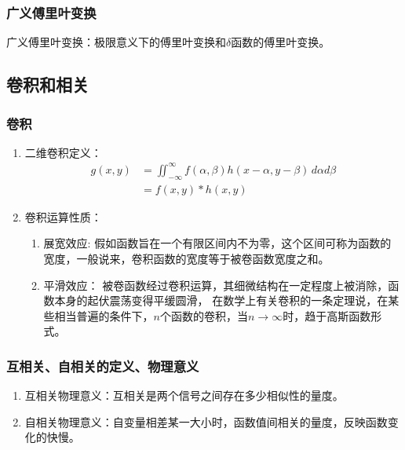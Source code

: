 \documentclass[twocolumn]{ctexart}
\begin{document}
\subsubsection{广义傅里叶变换}
广义傅里叶变换：极限意义下的傅里叶变换和$\delta $函数的傅里叶变换。

\subsection{卷积和相关}
\subsubsection{卷积}
\begin{enumerate}
    \item 二维卷积定义：
          \begin{equation}
              \begin{aligned}
                  g\left(x,y\right) & =\iint ^{\infty} _{-\infty} f\left(\alpha ,\beta\right)h\left(x-\alpha ,y-\beta \right)\,d\alpha d\beta \\
                                    & =f\left(x,y\right)\ast h\left(x,y\right)
              \end{aligned}
              \nonumber
          \end{equation}
    \item 卷积运算性质：
          \begin{enumerate}
              \item 展宽效应:
                    假如函数旨在一个有限区间内不为零，这个区间可称为函数的宽度，一般说来，卷积函数的宽度等于被卷函数宽度之和。
              \item 平滑效应：
                    被卷函数经过卷积运算，其细微结构在一定程度上被消除，函数本身的起伏震荡变得平缓圆滑，
                    在数学上有关卷积的一条定理说，在某些相当普遍的条件下，$n$个函数的卷积，当$n\to \infty$时，趋于高斯函数形式。
          \end{enumerate}
\end{enumerate}
\subsubsection{互相关、自相关的定义、物理意义}
\begin{enumerate}
    \item 互相关物理意义：互相关是两个信号之间存在多少相似性的量度。
    \item 自相关物理意义：自变量相差某一大小时，函数值间相关的量度，反映函数变化的快慢。
\end{enumerate}
\end{document}
